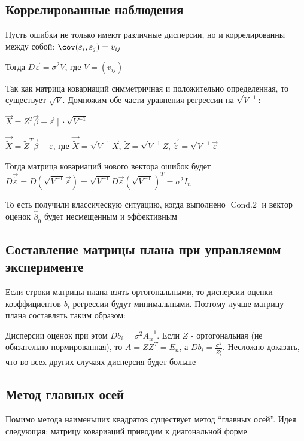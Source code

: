 \documentclass[12pt]{article}
\begin{document}
\subsection{Коррелированные наблюдения}

Пусть ошибки не только имеют различные дисперсии, но и коррелированны между собой: $\cov (\varepsilon_i, \varepsilon_j) = v_{ij}$

Тогда $D \vec \varepsilon = \sigma^2 V$, где $V = \left(v_{ij}\right)$

Так как матрица ковариаций симметричная и положительно определенная, то существует $\sqrt{V}$. Домножим обе части уравнения регрессии на $\sqrt{V^{-1}}$:

$\vec X = Z^T \vec{\beta} + \vec \varepsilon \ \Big| \ \cdot \sqrt{V^{-1}}$

$\vec \tilde{X} = \tilde Z^T \vec \beta + \varepsilon$, где $\vec \tilde{X} = \sqrt{V^{-1}} \vec X$, $\tilde Z = \sqrt{V^{-1}} Z$, $\vec \tilde{\varepsilon} = \sqrt{V^{-1}} \vec \varepsilon$

Тогда матрица ковариаций нового вектора ошибок будет $D \vec \tilde{\varepsilon} = D(\sqrt{V^{-1}} \vec \varepsilon) = \sqrt{V^{-1}} D \vec \varepsilon \left(\sqrt{V^{-1}}\right)^T = \sigma^2 I_n$

То есть получили классическую ситуацию, когда выполнено $\operatorname{Cond. 2}$ и вектор оценок $\hat \beta_0$ будет несмещенным и эффективным

\subsection{Составление матрицы плана при управляемом эксперименте}

Если строки матрицы плана взять ортогональными, то дисперсии оценки коэффициентов $b_i$ регрессии будут минимальными. Поэтому лучше матрицу плана составлять таким образом:

Дисперсии оценок при этом $D b_i = \sigma^2 A^{-1}_{ii}$. Если $Z$ - ортогональная (не обязательно нормированная), то $A = Z Z^T = E_n$, а $D b_i = \frac{\sigma^2}{Z_i^2}$. Несложно доказать, что во всех других случаях дисперсия будет больше

\subsection{Метод главных осей}

Помимо метода наименьших квадратов существует метод \enquote{главных осей}. Идея следующая: матрицу ковариаций приводим к диагональной форме
\end{document}
